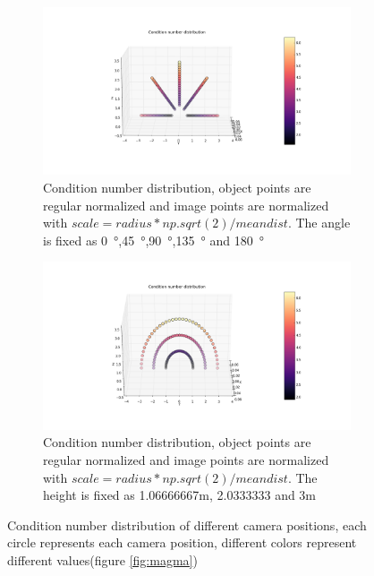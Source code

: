 \begin{figure}[H]
  \centering
  \begin{subfigure}[b]{1.0\textwidth}
    \includegraphics[width=\textwidth]{./fig/cond_num_Imag_Rnor_height.png}
    \caption{Condition number distribution, object points are regular normalized and image points are normalized with $scale = radius*np.sqrt(2) / meandist$. The angle is fixed as \SI{0}{\degree},\SI{45}{\degree},\SI{90}{\degree},\SI{135}{\degree} and \SI{180}{\degree}}
  \end{subfigure}
  \begin{subfigure}[b]{1.0\textwidth}
    \includegraphics[width=\textwidth]{./fig/cond_num_Imag_Rnor_angle.png}
    \caption{Condition number distribution, object points are regular normalized and image points are normalized with $scale = radius*np.sqrt(2) / meandist$. The height is fixed as 1.06666667m, 2.0333333 and 3m}
  \end{subfigure}
  \caption{Condition number distribution of different camera positions, each circle represents each camera position, different colors represent different values(figure \ref{fig:magma})}
  \label{fig:cond_num_Imag_Rnor_angleHeight}
\end{figure}  

